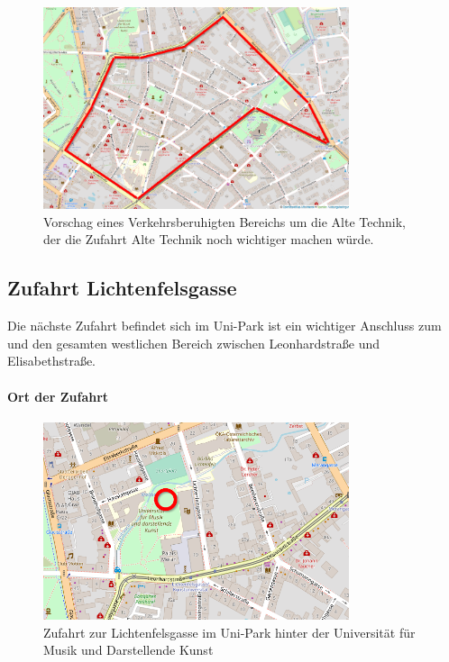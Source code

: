\begin{figure}
    \centering
    \includegraphics[width=0.8\textwidth]{main/bike/tunnel/uni/verkehrsberuhigter_bereich}
    \caption[Verkehrsberuhigkter Bereich Alte Technik]{Vorschag eines Verkehrsberuhigten Bereichs um die Alte Technik, der die Zufahrt Alte Technik noch wichtiger machen würde.}
\end{figure}

\subsection{Zufahrt Lichtenfelsgasse}
Die nächste Zufahrt befindet sich im Uni-Park ist ein wichtiger Anschluss zum  und den gesamten westlichen Bereich zwischen Leonhardstraße und Elisabethstraße.

\paragraph{Ort der Zufahrt}
\begin{figure}
    \centering
    \includegraphics[width=0.8\textwidth]{main/bike/tunnel/uni/zufahrt_lichtenfelsgasse}
    \caption[Zufahrt Lichtenfelsgasse]{Zufahrt zur Lichtenfelsgasse im Uni-Park hinter der Universität für Musik und Darstellende Kunst}
\end{figure}

